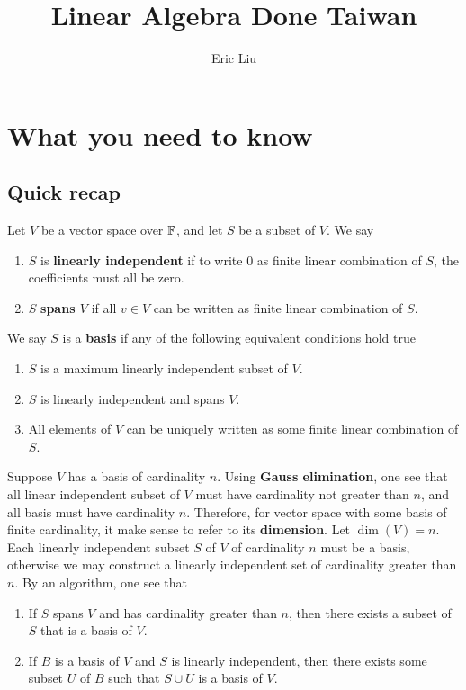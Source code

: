 \documentclass{report}
\title{Linear Algebra Done Taiwan}
\author{Eric Liu}
\date{}
\begin{document}
\maketitle
\newpage%

\tableofcontents
\pagebreak
\chapter{What you need to know}
\section{Quick recap}
Let $V$ be a vector space over $\mathbb{F}$, and let $S$ be a subset of $V$. We say  
\begin{enumerate}[label=(\alph*)]
  \item $S$ is \textbf{linearly independent} if to write $0$ as finite linear combination of  $S$, the coefficients must all be zero.
  \item  $S$  \textbf{spans $V$} if all $v\in V$ can be written as finite linear combination of $S$. 
\end{enumerate}
We say $S$ is a \textbf{basis} if any of the following equivalent conditions hold true 
\begin{enumerate}[label=(\alph*)]
  \item $S$ is a maximum linearly independent subset of  $V$.  
  \item $S$ is linearly independent and spans $V$.  
  \item All elements of $V$ can be uniquely written as some finite linear combination of  $S$. 
\end{enumerate}
Suppose $V$ has a basis  of cardinality $n$. Using \textbf{Gauss elimination}, one see that all linear independent subset of $V$ must have cardinality not greater than $n$, and all basis must have cardinality $n$. Therefore, for vector space with some basis of finite cardinality, it make sense to refer to its \textbf{dimension}. Let $\operatorname{dim}(V)=n$. Each linearly independent subset $S$ of  $V$ of cardinality  $n$ must be a basis, otherwise we may construct a linearly independent set of cardinality greater than  $n$. By an algorithm, one see that 
\begin{enumerate}[label=(\alph*)]
  \item If $S$ spans  $V$ and has cardinality greater than  $n$, then there exists a subset of $S$ that is a basis of $V$.  
  \item If $B$ is a basis of  $V$ and  $S$ is linearly independent, then there exists some subset  $U$ of $B$ such that  $S \cup  U$ is a basis of $V$.   
\end{enumerate}
\end{document}
